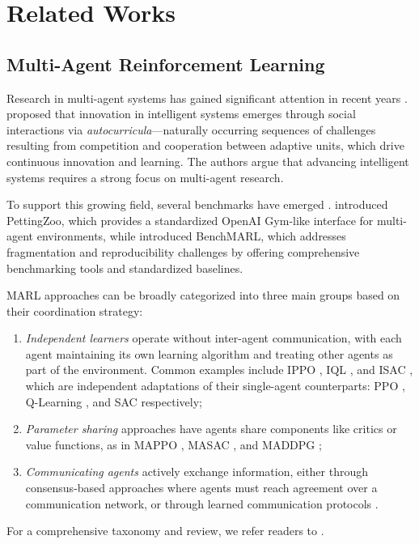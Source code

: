 \section{Related Works}
\vspace{0.1in}
\subsection{Multi-Agent Reinforcement Learning} 
\vspace{0.1in}
\label{sec:marl}

Research in multi-agent systems has gained significant attention in recent years \citep{Nguyen2020, Oroojlooy2023}. \citet{Leibo2019} proposed that innovation in intelligent systems emerges through social interactions via \emph{autocurricula}—naturally occurring sequences of challenges resulting from competition and cooperation between adaptive units, which drive continuous innovation and learning. The authors argue that advancing intelligent systems requires a strong focus on multi-agent research.

To support this growing field, several benchmarks have emerged \citep{Samvelyan2019, Hu2021, Bettini2024, Terry2021}. \citet{Terry2021} introduced PettingZoo, which provides a standardized OpenAI Gym-like \citep{Brockman2016} interface for multi-agent environments, while \citet{Bettini2024} introduced BenchMARL, which addresses fragmentation and reproducibility challenges by offering comprehensive benchmarking tools and standardized baselines.

MARL approaches can be broadly categorized into three main groups based on their coordination strategy:

\begin{enumerate}
\item \emph{Independent learners} operate without inter-agent communication, with each agent maintaining its own learning algorithm and treating other agents as part of the environment. Common examples include IPPO \citep{De2020}, IQL \citep{Thorpe1997}, and ISAC \citep{Bettini2024}, which are independent adaptations of their single-agent counterparts: PPO \citep{Schulman2017}, Q-Learning \citep{Watkins1992}, and SAC \citep{Haarnoja2018} respectively;
\item \emph{Parameter sharing} approaches have agents share components like critics or value functions, as in MAPPO \citep{Yu2022}, MASAC \citep{Bettini2024}, and MADDPG \citep{Lowe2017};
\item \emph{Communicating agents} actively exchange information, either through consensus-based approaches \citep{Cassano2020, Zhang2018} where agents must reach agreement over a communication network, or through learned communication protocols \citep{Foerster2016, Jorge2016}.
\end{enumerate}
For a comprehensive taxonomy and review, we refer readers to \citet{Oroojlooy2023}.

